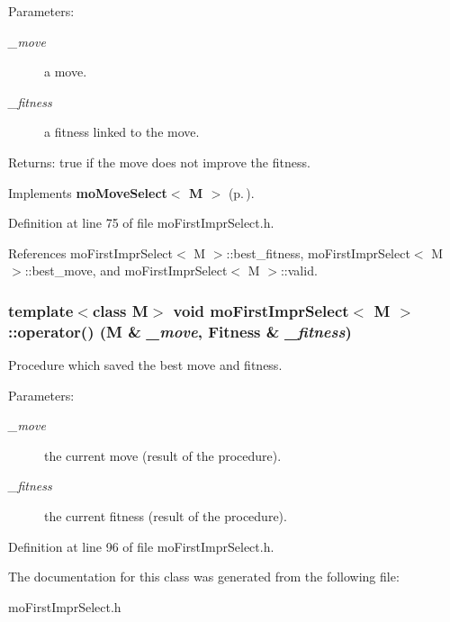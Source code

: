 \begin{Desc}
\item[Parameters:]
\begin{description}
\item[{\em \_\-move}]a move. \item[{\em \_\-fitness}]a fitness linked to the move. \end{description}
\end{Desc}
\begin{Desc}
\item[Returns:]true if the move does not improve the fitness. \end{Desc}


Implements {\bf mo\-Move\-Select$<$ M $>$} {\rm (p.\,\pageref{classmo_move_select_a1})}.

Definition at line 75 of file mo\-First\-Impr\-Select.h.

References mo\-First\-Impr\-Select$<$ M $>$::best\_\-fitness, mo\-First\-Impr\-Select$<$ M $>$::best\_\-move, and mo\-First\-Impr\-Select$<$ M $>$::valid.
\subsubsection{\setlength{\rightskip}{0pt plus 5cm}template$<$class M$>$ void {\bf mo\-First\-Impr\-Select}$<$ M $>$::operator() (M \& {\em \_\-move}, {\bf Fitness} \& {\em \_\-fitness})\hspace{0.3cm}{\tt  [inline]}}\label{classmo_first_impr_select_a2}


Procedure which saved the best move and fitness. 

\begin{Desc}
\item[Parameters:]
\begin{description}
\item[{\em \_\-move}]the current move (result of the procedure). \item[{\em \_\-fitness}]the current fitness (result of the procedure). \end{description}
\end{Desc}


Definition at line 96 of file mo\-First\-Impr\-Select.h.

The documentation for this class was generated from the following file:\begin{CompactItemize}
\item 
mo\-First\-Impr\-Select.h\end{CompactItemize}
